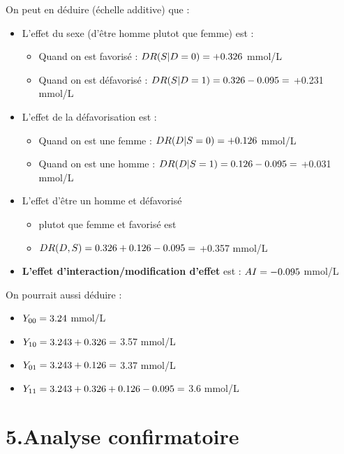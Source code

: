\documentclass[
]{book}
\providecommand{\tightlist}{%
  \setlength{\itemsep}{0pt}\setlength{\parskip}{0pt}}
\begin{document}
On peut en déduire (échelle additive) que :

\begin{itemize}
\tightlist
\item
  L'effet du sexe (d'être homme plutot que femme) est :

  \begin{itemize}
  \tightlist
  \item
    Quand on est favorisé : \(\small DR(S|D=0) = +0.326\) mmol/L
  \item
    Quand on est défavorisé : \(\small DR(S|D=1) = 0.326 - 0.095 =\) +0.231 mmol/L
  \end{itemize}
\item
  L'effet de la défavorisation est :

  \begin{itemize}
  \tightlist
  \item
    Quand on est une femme : \(\small DR(D|S=0) = +0.126\) mmol/L
  \item
    Quand on est une homme : \(\small DR(D|S=1) = 0.126 - 0.095 =\) +0.031 mmol/L
  \end{itemize}
\item
  L'effet d'être un homme et défavorisé

  \begin{itemize}
  \tightlist
  \item
    plutot que femme et favorisé est
  \item
    \(\small DR(D,S) = 0.326 + 0.126 - 0.095 =\) +0.357 mmol/L
  \end{itemize}
\item
  \textbf{L'effet d'interaction/modification d'effet} est : \(\small AI = -0.095\) mmol/L
\end{itemize}

On pourrait aussi déduire :

\begin{itemize}
\tightlist
\item
  \(\small Y_{00} = 3.24\) mmol/L
\item
  \(\small Y_{10} = 3.243 + 0.326 =\) 3.57 mmol/L
\item
  \(\small Y_{01} = 3.243 + 0.126 =\) 3.37 mmol/L
\item
  \(\small Y_{11} = 3.243 + 0.326 + 0.126 - 0.095 =\) 3.6 mmol/L
\end{itemize}

\hypertarget{analyse-confirmatoire}{%
\section{5.Analyse confirmatoire}\label{analyse-confirmatoire}}
\end{document}
